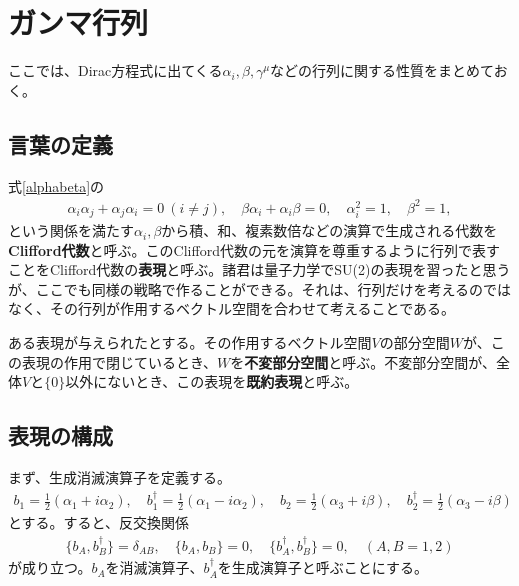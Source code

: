 \documentclass[report,paper=a4, fontsize=12pt, line_length=16cm, number_of_lines=33,dvipdfmx]{jlreq}
\numberwithin{equation}{chapter}
\newcommand{\strong}[1]{{\sffamily \bfseries #1}}
\begin{document}
\chapter{ガンマ行列}
\label{app:alphabeta}
ここでは、Dirac方程式に出てくる$\alpha_i,\beta, \gamma^{\mu}$などの行列に関する性質をまとめておく。

\section{言葉の定義}
式\eqref{alphabeta}の
\begin{align}
  \alpha_{i}\alpha_{j}+\alpha_{j}\alpha_{i}=0\ (i\ne j),\quad \beta \alpha_{i}+\alpha_{i}\beta=0,\quad
  \alpha_i^2=1,\quad \beta^2=1, \label{Clifford}
\end{align}
という関係を満たす$\alpha_i,\beta$から積、和、複素数倍などの演算で生成される代数を\strong{Clifford代数}と呼ぶ。このClifford代数の元を演算を尊重するように行列で表すことをClifford代数の\strong{表現}と呼ぶ。諸君は量子力学でSU(2)の表現を習ったと思うが、ここでも同様の戦略で作ることができる。それは、行列だけを考えるのではなく、その行列が作用するベクトル空間を合わせて考えることである。

ある表現が与えられたとする。その作用するベクトル空間$V$の部分空間$W$が、この表現の作用で閉じているとき、$W$を\strong{不変部分空間}と呼ぶ。不変部分空間が、全体$V$と$\{0\}$以外にないとき、この表現を\strong{既約表現}と呼ぶ。

\section{表現の構成}
まず、生成消滅演算子を定義する。
\begin{align}
  b_1=\frac12(\alpha_1+i\alpha_2),\quad b_1^{\dag}=\frac12(\alpha_1-i\alpha_2),\quad
  b_2=\frac12(\alpha_3+i\beta),\quad b_2^{\dag}=\frac12(\alpha_3-i\beta)
\label{fermionicoscillator}
\end{align}
とする。すると、反交換関係
\begin{align}
  \{b_A,b_B^{\dag}\}=\delta_{AB},\quad\{b_A,b_B\}=0,\quad\{b_A^{\dag},b_B^{\dag}\}=0,\quad (A,B=1,2)\label{lowestweight}
\end{align}
が成り立つ。$b_A$を消滅演算子、$b^{\dag}_A$を生成演算子と呼ぶことにする。
\end{document}
